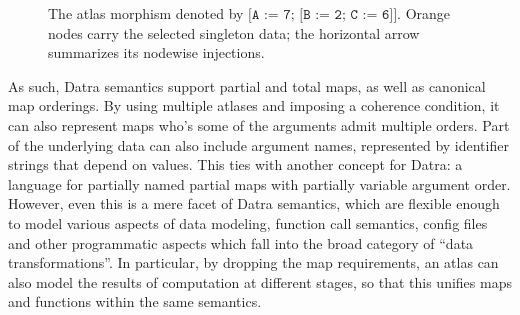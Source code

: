 \documentclass[11pt]{article}
\newcommand{\code}[1]{\texttt{#1}}
\begin{document}
\begin{figure}[htbp]
\centering
{}
\caption{The atlas morphism denoted by
  \(\code{[A := 7; [B := 2; C := 6]]}\). Orange nodes carry the selected
  singleton data; the horizontal arrow summarizes its nodewise injections.}
\label{fig:selected-morphism}
\end{figure}

As such, Datra semantics support partial and total maps, as well as canonical
map orderings. By using multiple atlases and imposing a coherence condition,
it can also represent maps who's some of the arguments admit multiple
orders. Part of the underlying data can also include argument names,
represented by identifier strings that depend on values. This ties with
another concept for Datra: a language for partially named partial maps with
partially variable argument order. However, even this is a mere facet of
Datra semantics, which are flexible enough to model various aspects of data
modeling, function call semantics, config files and other programmatic
aspects which fall into the broad category of ``data transformations''. In
particular, by dropping the map requirements, an atlas can also model the
results of computation at different stages, so that this unifies maps and
functions within the same semantics.
\end{document}
